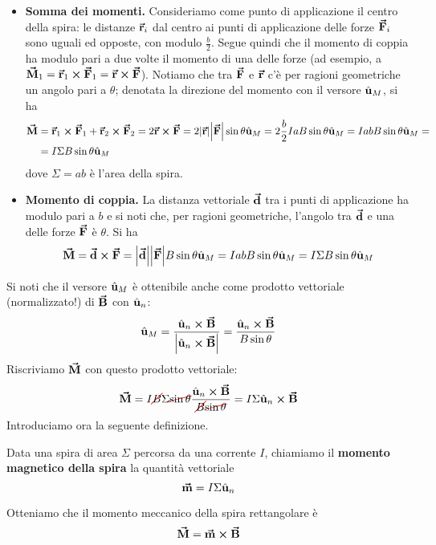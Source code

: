 \begin{itemize}
	\item \textbf{Somma dei momenti.} Consideriamo come punto di applicazione il centro della spira: le distanze $\vb*{\va{r}}_i$ dal centro ai punti di applicazione delle forze $\vb*{\va{F}}_i$ sono uguali ed opposte, con modulo $\frac{b}{2}$. Segue quindi che il momento di coppia ha modulo pari a due volte il momento di una delle forze (ad esempio, a $\vb*{\va{M}}_1=\vb*{\va{r}}_1\cross\vb*{\va{F}}_1=\vb*{\va{r}}\cross\vb*{\va{F}}$). Notiamo che tra $\vb*{\va{F}}$ e $\vb*{\va{r}}$ c'è per ragioni geometriche un angolo pari a $\theta$; denotata la direzione del momento con il versore $\hat{\mathbf{u}}_M$, si ha
	\begin{align*}
		\vb*{\va{M}}&=\vb*{\va{r}}_1\cross \vb*{\va{F}}_1+\vb*{\va{r}}_2\cross \vb*{\va{F}}_2=2\vb*{\va{r}}\cross\vb*{\va{F}}=2\abs{\vb*{\va{r}}}\abs{\vb*{\va{F}}}\sin\theta\hat{\mathbf{u}}_M=2\frac{b}{2}IaB\sin\theta\hat{\mathbf{u}}_M=Iab B \sin\theta\hat{\mathbf{u}}_M=\\
		&=I\Sigma B\sin\theta\hat{\mathbf{u}}_M
	\end{align*}
dove $\Sigma=ab$ è l'area della spira.
\item \textbf{Momento di coppia.} La distanza vettoriale $\vb*{\va{d}}$ tra i punti di applicazione ha modulo pari a $b$ e si noti che, per ragioni geometriche, l'angolo tra $\vb*{\va{d}}$ e una delle forze $\vb*{\va{F}}$ è $\theta$. Si ha
	\begin{equation*}
	\vb*{\va{M}}=\vb*{\va{d}}\cross\vb*{\va{F}}=\abs{\vb*{\va{d}}}\abs{\vb*{\va{F}}}B \sin\theta\hat{\mathbf{u}}_M=Iab B \sin\theta\hat{\mathbf{u}}_M=I\Sigma B\sin\theta\hat{\mathbf{u}}_M
\end{equation*}
\end{itemize}
Si noti che il versore $\hat{\mathbf{u}}_M$ è ottenibile anche come prodotto vettoriale (normalizzato!) di $\vb*{\va{B}}$ con $\hat{\mathbf{u}}_n$:
\begin{equation}
	\hat{\mathbf{u}}_M=\frac{\hat{\mathbf{u}}_n\cross\vb*{\va{B}}}{\abs{\hat{\mathbf{u}}_n\cross\vb*{\va{B}}}}=\frac{\hat{\mathbf{u}}_n\cross\vb*{\va{B}}}{B\sin\theta}
\end{equation}
Riscriviamo $\vb*{\va{M}}$ con questo prodotto vettoriale:
\begin{equation*}
	\vba{M}=I\Ccancel[red]{B}\Sigma\Ccancel[red]{\sin\theta}\frac{\vbh{u}_n\cross\vba{B}}{\Ccancel[red]{B}\Ccancel[red]{\sin\theta}}=I\Sigma\vbh{u}_n\cross\vba{B}
\end{equation*}
Introduciamo ora la seguente definizione.
\begin{define}
	Data una spira di area $\Sigma$ percorsa da una corrente $I$, chiamiamo il \textbf{momento magnetico della spira} la quantità vettoriale
	\begin{equation}
		\vb*{\va{m}}=I\Sigma\hat{\mathbf{u}}_n
	\end{equation}
\end{define}
Otteniamo che il momento meccanico della spira rettangolare è
\begin{equation}
	\vb*{\va{M}}=\vb*{\va{m}}\cross\vb*{\va{B}}
\end{equation}
